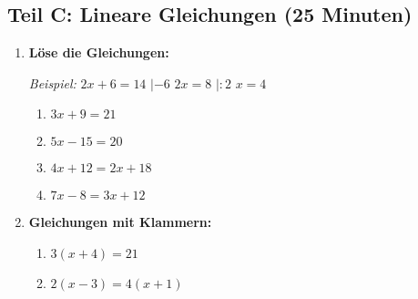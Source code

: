 \subsection*{Teil C: Lineare Gleichungen (25 Minuten)}

\begin{enumerate}[label=\arabic*.,resume]

    \item \textbf{Löse die Gleichungen:}

    \textit{Beispiel:} $2x + 6 = 14$ \hspace{1cm} $|{-6}$ \hspace{1cm} $2x = 8$ \hspace{1cm} $|{:2}$ \hspace{1cm} $x = 4$

    \vspace{0.5cm}

    \begin{enumerate}[label=\alph*)]
        \item $3x + 9 = 21$

        \vspace{2cm}

        \item $5x - 15 = 20$

        \vspace{2cm}

        \item $4x + 12 = 2x + 18$

        \vspace{2cm}

        \item $7x - 8 = 3x + 12$

        \vspace{2cm}

    \end{enumerate}

    \item \textbf{Gleichungen mit Klammern:}

    \begin{enumerate}[label=\alph*)]
        \item $3(x + 4) = 21$

        \vspace{2.5cm}

        \item $2(x - 3) = 4(x + 1)$

        \vspace{2.5cm}

    \end{enumerate}

\end{enumerate}